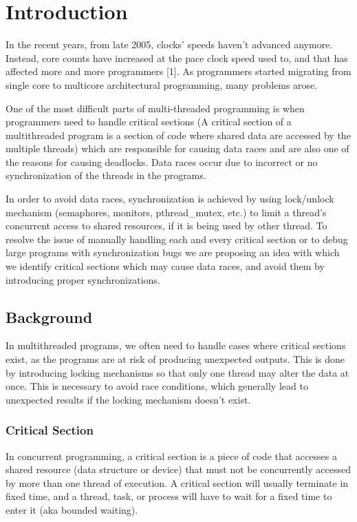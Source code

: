 \chapter{Introduction}

In the recent years, from late 2005, clocks’ speeds haven’t advanced anymore. Instead, core counts have increased at the pace clock speed used to, and that has affected more and more programmers [1]. As programmers started migrating from single core to multicore architectural programming, many problems arose.

One of the most difficult parts of multi-threaded programming is when programmers need to handle critical sections (A critical section of a multithreaded program is a section of code where shared data are accessed by the multiple threads) which are responsible for causing data races and are also one of the reasons for causing deadlocks. Data races occur due to incorrect or no synchronization of the threads in the programs.

In order to avoid data races, synchronization is achieved by using lock/unlock mechanism (semaphores, monitors, pthread\_mutex, etc.) to limit a thread’s concurrent access to shared resources, if it is being used by other thread. To resolve the issue of manually handling each and every critical section or to debug large programs with synchronization bugs we are proposing an idea with which we identify critical sections which may cause data races, and avoid them by introducing proper synchronizations.
\newpage
\section{Background}
In multithreaded programs, we often need to handle cases where critical sections exist, as the programs are at risk of producing unexpected outputs. This is done by introducing locking mechanisms so that only one thread may alter the data at once. This is necessary to avoid race conditions, which generally lead to unexpected results if the locking mechanism doesn't exist.

\subsection{Critical Section}
In concurrent programming, a critical section is a piece of code that accesses a shared resource (data structure or device) that must not be concurrently accessed by more than one thread of execution. A critical section will usually terminate in fixed time, and a thread, task, or process will have to wait for a fixed time to enter it (aka bounded waiting).

